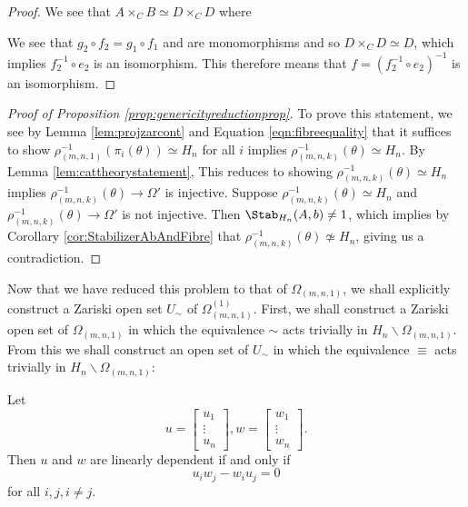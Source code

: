 \documentclass[11pt,letterpaper]{amsart}
\begin{document}
\begin{proof}
    We see that $A\times_C B\simeq D\times_C D$ where 
    \begin{center}
    \end{center}
    We see that $g_2\circ f_2 = g_1\circ f_1$ and are monomorphisms and so $D\times_C D \simeq D$, which implies $f_2^{-1}\circ e_2$ is an isomorphism. This therefore means that $f=(f_2^{-1}\circ e_2)^{-1}$ is an isomorphism. 
\end{proof}
\begin{proof}[Proof of Proposition \ref{prop:genericityreductionprop}]
    \par To prove this statement, we see by Lemma \ref{lem:projzarcont} and Equation \ref{eqn:fibreequality} that it suffices to show $\rho_{(m,n,1)}^{-1}(\pi_i(\theta))\simeq H_n$ for all $i$ implies $\rho_{(m,n,k)}^{-1}(\theta)\simeq H_n$. By Lemma \ref{lem:cattheorystatement}, This reduces to showing $\rho_{(m,n,k)}^{-1}(\theta)\simeq H_n$ implies $\rho_{(m,n,k)}^{-1}(\theta)\rightarrow \Omega'$ is injective. Suppose $\rho_{(m,n,k)}^{-1}(\theta)\simeq H_n$ and $\rho_{(m,n,k)}^{-1}(\theta)\rightarrow \Omega'$ is not injective. Then $\Stab_{H_n}(A,b)\neq 1$, which implies by Corollary \ref{cor:StabilizerAbAndFibre} that $\rho_{(m,n,k)}^{-1}(\theta)\not\simeq H_n$, giving us a contradiction. 
\end{proof}
Now that we have reduced this problem to that of $\Omega_{(m,n,1)}$, we shall explicitly construct a Zariski open set $U_\sim$ of $\Omega_{(m,n,1)}^{(1)}$. First, we shall construct a Zariski open set of $\Omega_{(m,n,1)}$ in which the equivalence $\sim$ acts trivially in $H_n\backslash \Omega_{(m,n,1)}$. From this we shall construct an open set of $U_\sim$ in which the equivalence $\equiv$ acts trivially in $H_n\backslash \Omega_{(m,n,1)}$:
\begin{lemma}
    Let
    $$
    u = \begin{bmatrix}
        u_1 \\ \vdots\\ u_n
    \end{bmatrix}, w = \begin{bmatrix}
        w_1 \\ \vdots \\ w_n
    \end{bmatrix}.
    $$
    Then $u$ and $w$ are linearly dependent if and only if 
    $$
    u_i w_j - w_i u_j =0
    $$
    for all $i, j, i\neq j$.
\end{lemma}
\end{document}

